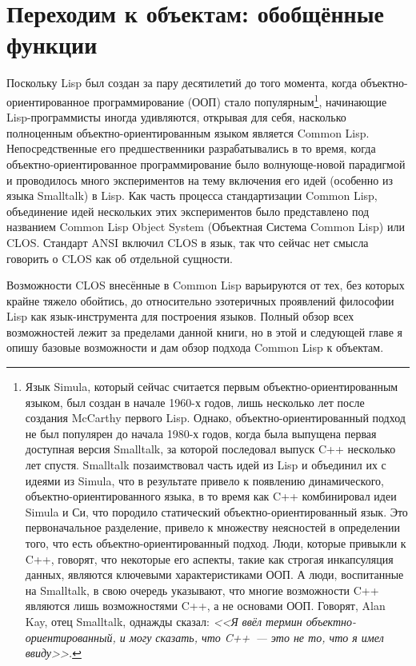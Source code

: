 \chapter{Переходим к объектам: обобщённые функции}
\label{ch:16}

Поскольку Lisp был создан за пару десятилетий до того момента, когда
объектно-ориентированное программирование (ООП) стало популярным\footnote{Язык Simula,
  который сейчас считается первым объектно-ориентированным языком, был создан в начале
  1960-х годов, лишь несколько лет после создания McCarthy первого Lisp.  Однако,
  объектно-ориентированный подход не был популярен до начала 1980-х годов, когда была
  выпущена первая доступная версия Smalltalk, за которой последовал выпуск C++ несколько
  лет спустя.  Smalltalk позаимствовал часть идей из Lisp и объединил их с идеями из
  Simula, что в результате привело к появлению динамического, объектно-ориентированного
  языка, в то время как C++ комбинировал идеи Simula и Си, что породило статический
  объектно-ориентированный язык. Это первоначальное разделение, привело к множеству
  неясностей в определении того, что есть объектно-ориентированный подход.  Люди, которые
  привыкли к C++, говорят, что некоторые его аспекты, такие как строгая инкапсуляция
  данных, являются ключевыми характеристиками ООП. А люди, воспитанные на Smalltalk, в
  свою очередь указывают, что многие возможности C++ являются лишь возможностями C++, а не
  основами ООП.  Говорят, Alan Kay, отец Smalltalk, однажды сказал: \textit{<<Я ввёл термин
    объектно-ориентированный, и могу сказать, что C++~--- это не то, что я имел ввиду>>.}},
начинающие Lisp-программисты иногда удивляются, открывая для себя, насколько полноценным
объектно-ориентированным языком является Common Lisp.  Непосредственные его
предшественники разрабатывались в то время, когда объектно-ориентированное
программирование было волнующе-новой парадигмой и проводилось много экспериментов на тему
включения его идей (особенно из языка Smalltalk) в Lisp.  Как часть процесса
стандартизации Common Lisp, объединение идей нескольких этих экспериментов было
представлено под названием Common Lisp Object System (Объектная Система Common Lisp) или
CLOS. Стандарт ANSI
включил CLOS в язык, так что сейчас нет смысла говорить о CLOS как об отдельной сущности.

Возможности CLOS внесённые в Common Lisp варьируются от тех, без которых крайне тяжело
обойтись, до относительно эзотеричных проявлений философии Lisp как язык-инструмента для
построения языков.  Полный обзор всех возможностей лежит за пределами данной книги, но в
этой и следующей главе я опишу базовые возможности и дам обзор подхода Common Lisp к
объектам.

